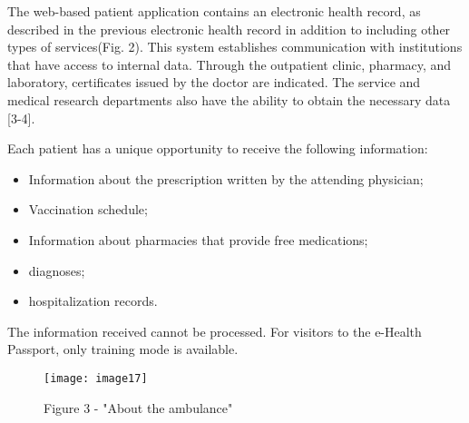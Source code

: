\begin{multicols}{2}

The web-based patient application contains an electronic health record,
as described in the previous electronic health record in addition to
including other types of services(Fig. 2). This system establishes
communication with institutions that have access to internal data.
Through the outpatient clinic, pharmacy, and laboratory, certificates
issued by the doctor are indicated. The service and medical research
departments also have the ability to obtain the necessary data
{[}3-4{]}.

Each patient has a unique opportunity to receive the following
information:

\begin{itemize}
\item
  Information about the prescription written by the attending physician;
\item
  Vaccination schedule;
\item
  Information about pharmacies that provide free medications;
\item
  diagnoses;
\item
  hospitalization records.
\end{itemize}

The information received cannot be processed. For visitors to the
e-Health Passport, only training mode is available.

\end{multicols}

\begin{figure}[H]
  \centering
  \texttt{[image: image17]}
  \caption*{Figure 3 - "About the ambulance"}
\end{figure}

